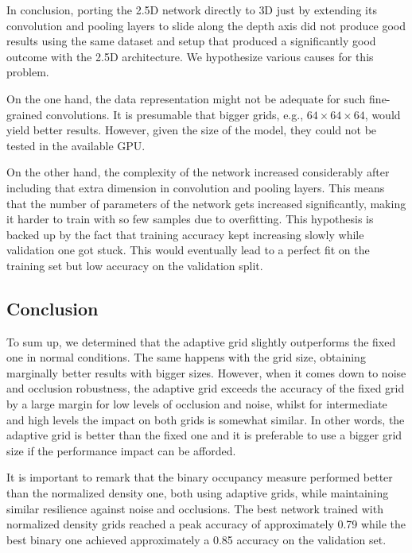 In conclusion, porting the \acs{2.5D} network directly to \acs{3D} just by extending its convolution and pooling layers to slide along the depth axis did not produce good results using the same dataset and setup that produced a significantly good outcome with the \acs{2.5D} architecture. We hypothesize various causes for this problem.

On the one hand, the data representation might not be adequate for such fine-grained convolutions. It is presumable that bigger grids, e.g., $64\times64\times64$, would yield better results. However, given the size of the model, they could not be tested in the available GPU.

On the other hand, the complexity of the network increased considerably after including that extra dimension in convolution and pooling layers. This means that the number of parameters of the network gets increased significantly, making it harder to train with so few samples due to overfitting. This hypothesis is backed up by the fact that training accuracy kept increasing slowly while validation one got stuck. This would eventually lead to a perfect fit on the training set but low accuracy on the validation split.

\subsection{Conclusion}
\label{cha:objrecog:sec:study:subsec:conclusion}

To sum up, we determined that the adaptive grid slightly outperforms the fixed one in normal conditions. The same happens with the grid size, obtaining marginally better results with bigger sizes. However, when it comes down to noise and occlusion robustness, the adaptive grid exceeds the accuracy of the fixed grid by a large margin for low levels of occlusion and noise, whilst for intermediate and high levels the impact on both grids is somewhat similar. In other words, the adaptive grid is better than the fixed one and it is preferable to use a bigger grid size if the performance impact can be afforded.

It is important to remark that the binary occupancy measure performed better than the normalized density one, both using adaptive grids, while maintaining similar resilience against noise and occlusions. The best network trained with normalized density grids reached a peak accuracy of approximately 0.79 while the best binary one achieved approximately a 0.85 accuracy on the validation set.

